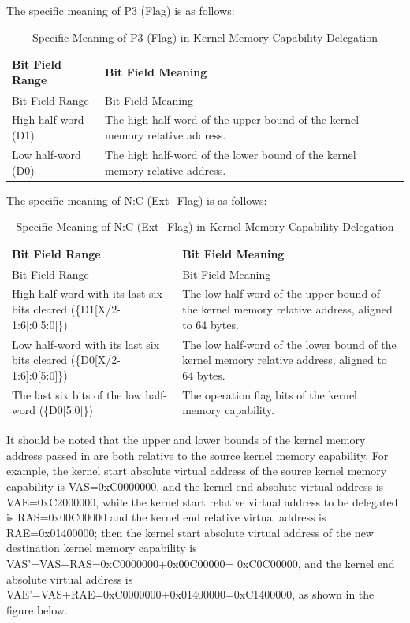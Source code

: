 The specific meaning of P3 (Flag) is as follows:

\begin{xltabular}{\textwidth}{@{}>{\hsize\raggedright\arraybackslash}X>{\hsize\raggedright\arraybackslash}X@{}}
\caption{Specific Meaning of P3 (Flag) in Kernel Memory Capability Delegation}\label{tab:3-24-kernel-memory-p3-flag-meaning}\\
\toprule
Bit Field Range & Bit Field Meaning\tabularnewline
\endfirsthead
\toprule
Bit Field Range & Bit Field Meaning\tabularnewline
\midrule
\endhead
\bottomrule
\endlastfoot
High half-word (D1) & The high half-word of the upper bound of the kernel memory relative address.\tabularnewline
Low half-word (D0) & The high half-word of the lower bound of the kernel memory relative address.\tabularnewline
\end{xltabular}
\nopagebreak[4]

The specific meaning of N:C (Ext\_Flag) is as follows:

\begin{xltabular}{\textwidth}{@{}>{\hsize\raggedright\arraybackslash}X>{\hsize\raggedright\arraybackslash}X@{}}
\caption{Specific Meaning of N:C (Ext\_Flag) in Kernel Memory Capability Delegation}\label{tab:3-25-kernel-memory-ext-flag-meaning}\\
\toprule
Bit Field Range & Bit Field Meaning\tabularnewline
\endfirsthead
\toprule
Bit Field Range & Bit Field Meaning\tabularnewline
\midrule
\endhead
\bottomrule
\endlastfoot
High half-word with its last six bits cleared (\{D1[X/2-1:6]:0[5:0]\}) &
The low half-word of the upper bound of the kernel memory relative address, aligned to 64 bytes.\tabularnewline
Low half-word with its last six bits cleared (\{D0[X/2-1:6]:0[5:0]\}) &
The low half-word of the lower bound of the kernel memory relative address, aligned to 64 bytes.\tabularnewline
The last six bits of the low half-word (\{D0[5:0]\}) & The operation flag bits of the kernel memory capability.\tabularnewline
\end{xltabular}
\nopagebreak[4]

It should be noted that the upper and lower bounds of the kernel memory address passed in are both relative to the source kernel memory capability. For example, the kernel start absolute virtual address of the source kernel memory capability is VAS=0xC0000000, and the kernel end absolute virtual address is VAE=0xC2000000, while the kernel start relative virtual address to be delegated is RAS=0x00C00000 and the kernel end relative virtual address is RAE=0x01400000; then the kernel start absolute virtual address of the new destination kernel memory capability is VAS'=VAS+RAS=0xC0000000+0x00C00000=
0xC0C00000, and the kernel end absolute virtual address is VAE'=VAS+RAE=0xC0000000+0x01400000=0xC1400000, as shown in the figure below.

